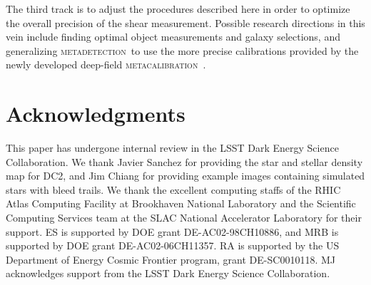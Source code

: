 \documentclass[twocolumn,twocolappendix,astrosym]{openjournal}
\newcommand{\mcal}{\textsc{metacalibration}}
\newcommand{\mdet}{\textsc{metadetection}}
\begin{document}
The third track is to adjust the procedures described here in order to optimize
the overall precision of the shear measurement. Possible research directions in
this vein include finding optimal object measurements and galaxy selections,
and generalizing \mdet\ to use the more precise calibrations
provided by the newly developed deep-field \mcal\ \citep{dfmcal22}.

\section*{Acknowledgments}

This paper has undergone internal review in the LSST Dark Energy Science
Collaboration. %
We thank Javier Sanchez for providing the star and stellar density map for DC2,
and Jim Chiang for providing example images containing simulated stars
with bleed trails.
We thank the excellent computing staffs of the RHIC Atlas Computing Facility at
Brookhaven National Laboratory and the Scientific Computing Services team at
the SLAC National Accelerator Laboratory for their support.
ES is supported by DOE grant DE-AC02-98CH10886, and MRB is supported by DOE
grant DE-AC02-06CH11357. RA is supported by the US Department of Energy Cosmic
Frontier program, grant DE-SC0010118.  MJ acknowledges support from the LSST
Dark Energy Science Collaboration.



%
%
%
%


\end{document}
